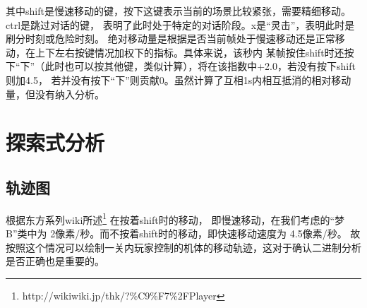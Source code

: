 \documentclass[UTF8]{ctexart}
\begin{document}
其中shift是慢速移动的键，按下这键表示当前的场景比较紧张，需要精细移动。ctrl是跳过对话的键，
表明了此时处于特定的对话阶段。x是“灵击”，表明此时是刷分时刻或危险时刻。
绝对移动量是根据是否当前帧处于慢速移动还是正常移动，在上下左右按键情况加权下的指标。具体来说，该秒内
某帧按住shift时还按下“下”（此时也可以按其他键，类似计算），将在该指数中+2.0，若没有按下shift则加4.5，
若并没有按下“下”则贡献0。虽然计算了互相1s内相互抵消的相对移动量，但没有纳入分析。

\section{探索式分析}

\subsection{轨迹图}

根据东方系列wiki所述\footnote{ http://wikiwiki.jp/thk/?\%C9\%F7\%2FPlayer } 在按着shift时的移动，
即慢速移动，在我们考虑的“梦B”类中为 2像素/秒。而不按着shift时的移动，即快速移动速度为 4.5像素/秒。
故按照这个情况可以绘制一关内玩家控制的机体的移动轨迹，这对于确认二进制分析是否正确也是重要的。
\end{document}
